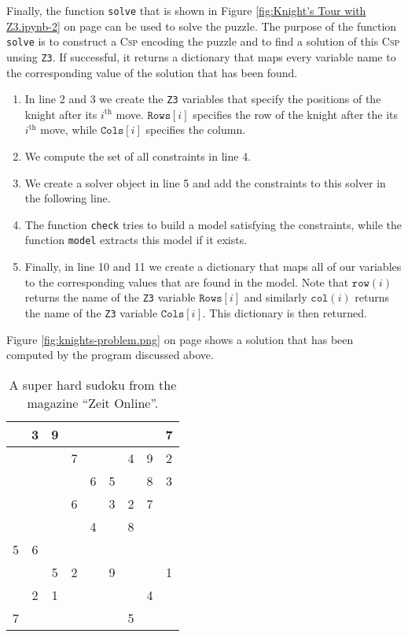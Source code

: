 Finally, the function \texttt{solve} that is shown in Figure \ref{fig:Knight's Tour with Z3.ipynb-2} on page
\pageref{fig:Knight's Tour with Z3.ipynb-2} can be used to solve the puzzle.
The purpose of the function \texttt{solve} is to construct a \textsc{Csp} encoding the puzzle and to find a
solution of this \textsc{Csp} unsing \texttt{Z3}.
If successful, it returns a dictionary that maps every variable name to the corresponding value of the solution
that has been found.
\begin{enumerate}
\item In line 2 and 3 we create the \texttt{Z3} variables that specify the positions of the knight after its
      $i^{\mathrm{th}}$ move.  $\texttt{Rows}[i]$ specifies the row of the knight after the its
      $i^{\mathrm{th}}$ move, while $\texttt{Cols}[i]$ specifies the column.
\item We compute the set of all constraints in line 4.   
\item We create a solver object in line 5 and add the constraints to this solver in the following line.
\item The function \texttt{check} tries to build a model satisfying the constraints, while the function
      \texttt{model} extracts this model if it exists.
\item Finally, in line 10 and 11 we create a dictionary that maps all of our variables to the corresponding
      values that are found in the model.  Note that $\texttt{row}(i)$ returns the name of the
      \texttt{Z3} variable $\texttt{Rows}[i]$ and similarly $\mathtt{col}(i)$ returns the name of the
      \texttt{Z3} variable $\texttt{Cols}[i]$.
      This dictionary is then returned.
\end{enumerate}
Figure \ref{fig:knights-problem.png} on page \pageref{fig:knights-problem.png} shows a solution that has been
computed by the program discussed above.






\begin{table}[h]
  \centering
  \begin{tabular}{||c|c|c||c|c|c||c|c|c||}
    \hline
    \hline
      & 3 & 9 &   &   &   &   &   & 7 \\
    \hline
      &   &   & 7 &   &   & 4 & 9 & 2 \\
    \hline
      &   &   &   & 6 & 5 &   & 8 & 3 \\
    \hline
    \hline
      &   &   & 6 &   & 3 & 2 & 7 &   \\
    \hline
      &   &   &   & 4 &   & 8 &   &   \\
    \hline
    5 & 6 &   &   &   &   &   &   &   \\
    \hline
    \hline
      &   & 5 & 2 &   & 9 &   &   & 1 \\
    \hline
      & 2 & 1 &   &   &   &   & 4 &   \\
    \hline
    7 &   &   &   &   &   & 5 &   &   \\
    \hline
    \hline
  \end{tabular}
  \caption{A super hard sudoku from the magazine ``Zeit Online''.}
  \label{tab:sudoku}
\end{table}


